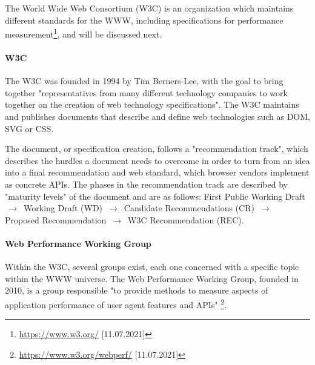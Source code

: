 The World Wide Web Consortium (W3C) is an organization which maintains different standards for the WWW, including specifications for performance measurement\footnote{\url{https://www.w3.org/} [11.07.2021]}, and will be discussed next.


\paragraph{W3C}


The W3C was founded in 1994 by Tim Berners-Lee, with the goal to bring together "representatives from many different technology companies to work together on the creation of web technology specifications". %
The W3C maintains and publishes documents that describe and define web technologies such as DOM, SVG or CSS. %



The document, or specification creation, follows a "recommendation track", which describes the hurdles a document needs to overcome in order to turn from an idea into a final recommendation and web standard, which browser vendors implement as concrete APIs. %
The phases in the recommendation track are described by "maturity levels" of the document and are as follows:
First Public Working Draft $\,\to\,$ Working Draft (WD) $\,\to\,$ Candidate Recommendations (CR) $\,\to\,$ Proposed Recommendation $\,\to\,$ W3C Recommendation (REC).  %



\paragraph{Web Performance Working Group}


Within the W3C, several groups exist, each one concerned with a specific topic within the WWW universe. %
The Web Performance Working Group, founded in 2010, is a group responsible "to provide methods to measure aspects of application performance of user agent features and APIs" \footnote{\url{https://www.w3.org/webperf/} [11.07.2021]}.



